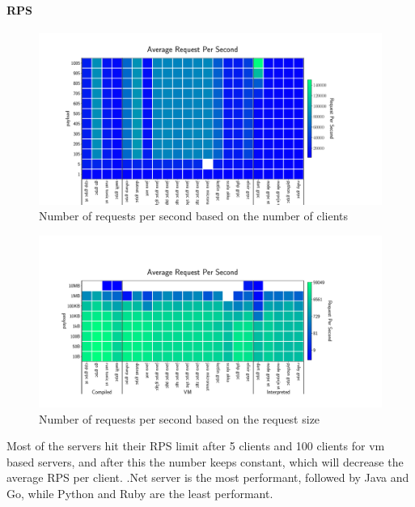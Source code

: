 \paragraph{RPS}
\begin{figure}[!hbt]
    \begin{center}
        \includegraphics[width=1.2\linewidth]{imgs/rps_clients}
    \end{center}
    \caption{Number of requests per second based on the number of clients}\label{fig:rps_clients}
\end{figure}

\begin{figure}[!hbt]
    \begin{center}
        \includegraphics[width=1.2\linewidth]{imgs/rps_payload}
    \end{center}
    \caption{Number of requests per second based on the request size}\label{fig:rps_payload}
\end{figure}
Most of the servers hit their RPS limit after 5 clients and 100 clients for vm based servers, and after this the number keeps constant, which will decrease the average RPS per client.
.Net server is the most performant, followed by Java and Go, while Python and Ruby are the least performant.

